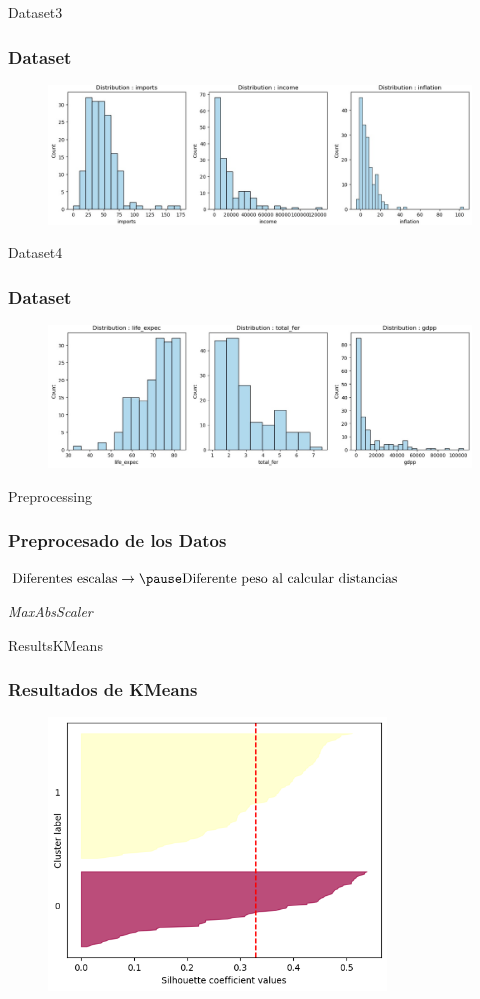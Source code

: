 \documentclass{beamer}
\begin{document}
\begin{frame}{Dataset3}
  \frametitle{Dataset}
  \centering
  \begin{figure}
    \includegraphics[width=\textwidth]{../images/data/features-analysis-2.jpg}
  \end{figure}
\end{frame}

\begin{frame}{Dataset4}
  \frametitle{Dataset}
  \centering
  \begin{figure}
    \includegraphics[width=\textwidth]{../images/data/features-analysis-3.jpg}
  \end{figure}
\end{frame}

\begin{frame}{Preprocessing}
  \frametitle{Preprocesado de los Datos}
  \centering
  $\hbox{Diferentes escalas} \rightarrow \pause \hbox{Diferente peso al calcular distancias}$
  \pause

  \vspace{30pt}
  \textit{MaxAbsScaler}
\end{frame}

\begin{frame}{ResultsKMeans}
  \frametitle{Resultados de KMeans}
  \begin{figure}
    \includegraphics[width=0.8\textwidth]{../images/kmeans/silhouette.png}
  \end{figure}
\end{frame}
\end{document}
